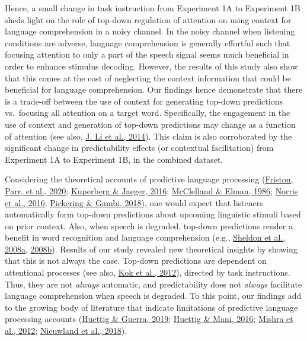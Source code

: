 \documentclass[a4paper, nobind]{templates/ociamthesis}
\begin{document}
Hence, a small change in task instruction from Experiment 1A to Experiment 1B sheds light on the role of top-down regulation of attention on using context for language comprehension in a noisy channel.
In the noisy channel when listening conditions are adverse, language comprehension is generally effortful such that focusing attention to only a part of the speech signal seems much beneficial in order to enhance stimulus decoding.
However, the results of this study also show that this comes at the cost of neglecting the context information that could be beneficial for language comprehension.
Our findings hence demonstrate that there is a trade-off between the use of context for generating top-down predictions vs.~focusing all attention on a target word.
Specifically, the engagement in the use of context and generation of top-down predictions may change as a function of attention (see also, \protect\hyperlink{ref-Li2014}{J. Li et al., 2014}).
This claim is also corroborated by the significant change in predictability effects (or contextual facilitation) from Experiment 1A to Experiment 1B, in the combined dataset.

Considering the theoretical accounts of predictive language processing (\protect\hyperlink{ref-Friston2020}{Friston, Parr, et al., 2020}; \protect\hyperlink{ref-Kuperberg2016}{Kuperberg \& Jaeger, 2016}; \protect\hyperlink{ref-Mcclelland1986}{McClelland \& Elman, 1986}; \protect\hyperlink{ref-Norris2016}{Norris et al., 2016}; \protect\hyperlink{ref-Pickering2018}{Pickering \& Gambi, 2018}), one would expect that listeners automatically form top-down predictions about upcoming linguistic stimuli based on prior context.
Also, when speech is degraded, top-down predictions render a benefit in word recognition and language comprehension (e.g., \protect\hyperlink{ref-Sheldon2008a}{Sheldon et al., 2008a}, \protect\hyperlink{ref-Sheldon2008b}{2008b}).
Results of our study revealed new theoretical insights by showing that this is not always the case.
Top-down predictions are dependent on attentional processes (see also, \protect\hyperlink{ref-Kok2012}{Kok et al., 2012}), directed by task instructions.
Thus, they are not \emph{always} automatic, and predictability does not \emph{always} facilitate language comprehension when speech is degraded.
To this point, our findings add to the growing body of literature that indicate limitations of predictive language processing accounts (\protect\hyperlink{ref-Huettig2019}{Huettig \& Guerra, 2019}; \protect\hyperlink{ref-Huettig2016}{Huettig \& Mani, 2016}; \protect\hyperlink{ref-Mishra2012}{Mishra et al., 2012}; \protect\hyperlink{ref-Nieuwland2018}{Nieuwland et al., 2018}).
\end{document}
